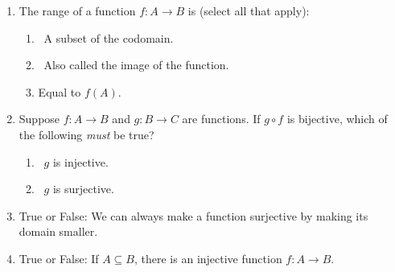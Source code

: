 \pagestyle{empty}


\begin{enumerate}
	\item The range of a function $f:A\to B$ is (select all that apply):
	\begin{enumerate}
		\item {} \ A subset of the codomain.
	  \setcounter{enumii}{2}
		\item {}\ Also called the image of the function.
	  \setcounter{enumii}{4}
		\item Equal to $f(A)$.
	\end{enumerate}

	\item Suppose $f:A\to B$ and $g:B\to C$ are functions. If $g\circ f$ is bijective, which of the following \emph{must} be true?
	\begin{enumerate}
	  \item {} \ $g$ is injective.
	  \setcounter{enumii}{2}
    \item {} \ $g$ is surjective.
  \end{enumerate}
    
  \item True or False: We can always make a function surjective by making its domain smaller.
    
  \item True or False: If $A\subseteq B$, there is an injective function $f:A\to B$.
\end{enumerate}



